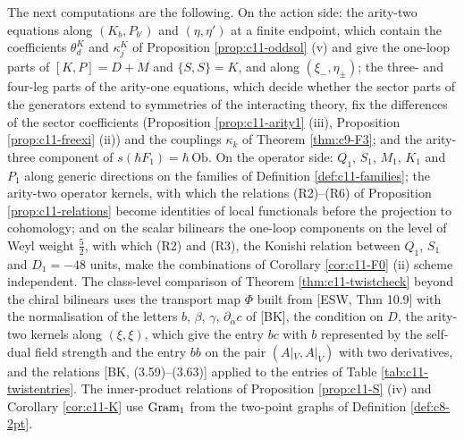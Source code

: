 \begin{remark}
\label{rem:c11-next}
The next computations are the following. On the action side: the arity-two equations along $(K_b,P_{b'})$ and $(\eta,\eta')$ at a finite endpoint, which contain the coefficients $\theta^K_d$ and $\kappa^K_j$ of Proposition \ref{prop:c11-oddsol} (v) and give the one-loop parts of $[K,P]=D+M$ and $\{S,S\}=K$, and along $(\xi_-,\eta_\pm)$; the three- and four-leg parts of the arity-one equations, which decide whether the sector parts of the generators extend to symmetries of the interacting theory, fix the differences of the sector coefficients (Proposition \ref{prop:c11-arity1} (iii), Proposition \ref{prop:c11-freexi} (ii)) and the couplings $\kappa_k$ of Theorem \ref{thm:c9-F3}; and the arity-three component of $s(\hbar F_1)=\hbar\,\mathrm{Ob}$. On the operator side: $Q_1$, $S_1$, $M_1$, $K_1$ and $P_1$ along generic directions on the families of Definition \ref{def:c11-families}; the arity-two operator kernels, with which the relations (R2)--(R6) of Proposition \ref{prop:c11-relations} become identities of local functionals before the projection to cohomology; and on the scalar bilinears the one-loop components on the level of Weyl weight $\tfrac52$, with which (R2) and (R3), the Konishi relation between $Q_1$, $S_1$ and $D_1=-48$ units, make the combinations of Corollary \ref{cor:c11-F0} (ii) scheme independent. The class-level comparison of Theorem \ref{thm:c11-twistcheck} beyond the chiral bilinears uses the transport map $\Phi$ built from [ESW, Thm 10.9] with the normalisation of the letters $b$, $\beta$, $\gamma$, $\partial_{\dot\alpha}c$ of [BK], the condition on $D$, the arity-two kernels along $(\xi,\xi)$, which give the entry $bc$ with $b$ represented by the self-dual field strength and the entry $bb$ on the pair $(A|_V,A|_V)$ with two derivatives, and the relations [BK, (3.59)--(3.63)] applied to the entries of Table \ref{tab:c11-twistentries}. The inner-product relations of Proposition \ref{prop:c11-S} (iv) and Corollary \ref{cor:c11-K} use $\mathrm{Gram}_{\rm 1}$ from the two-point graphs of Definition \ref{def:c8-2pt}.
\end{remark}
